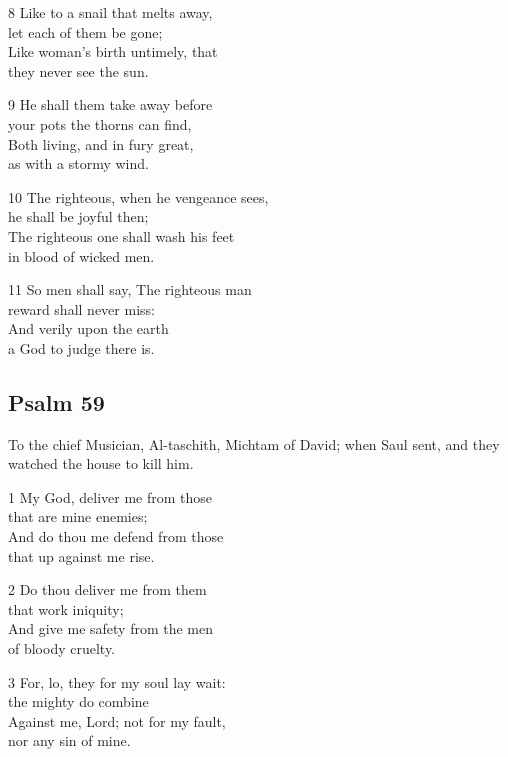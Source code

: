 \begin{multicols}{3}
8 Like to a snail that melts away,\\
let each of them be gone;\\
Like woman’s birth untimely, that\\
they never see the sun.

9 He shall them take away before\\
your pots the thorns can find,\\
Both living, and in fury great,\\
as with a stormy wind.

10 The righteous, when he vengeance sees,\\
he shall be joyful then;\\
The righteous one shall wash his feet\\
in blood of wicked men.

11 So men shall say, The righteous man\\
reward shall never miss:\\
And verily upon the earth\\
a God to judge there is.

\begin{center}
\quad{}\quad{}
\end{center}

\subsection*{Psalm 59}

To the chief Musician, Al-taschith, Michtam of David;
when Saul sent, and they watched the house to kill him.

1 My God, deliver me from those\\
that are mine enemies;\\
And do thou me defend from those\\
that up against me rise.

2 Do thou deliver me from them\\
that work iniquity;\\
And give me safety from the men\\
of bloody cruelty.

3 For, lo, they for my soul lay wait:\\
the mighty do combine\\
Against me, Lord; not for my fault,\\
nor any sin of mine.


\end{multicols}
